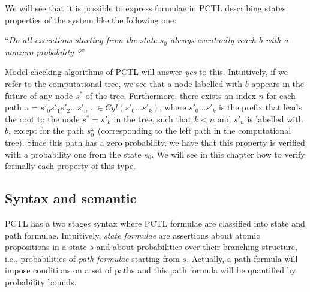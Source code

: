 \begin{example}
\begin{figure}[h]
\begin{minipage}{0.6\linewidth}
    \captionsetup{justification=centering}
    \label{ct2}
  \end{minipage}
\end{figure}
We will see that it is possible to express formulae in PCTL describing states properties of the system like the following one:
\begin{center}
``\textit{Do all executions starting from the state $s_0$ always eventually reach $b$ with a nonzero probability ?}''
\end{center}
Model checking algorithms of PCTL will answer \textit{yes} to this.
Intuitively, if we refer to the computational tree,
we see that a node labelled with $b$ appears in the future of any node $s^*$ of the tree. Furthermore, there exists an index $n$ for each path $\pi = s'_0 s'_1 s'_2 \dots s'_n \dots \in Cyl(s'_0 \dots s'_k)$, where $s'_0 \dots s'_k$ is the prefix that leads the root to the node $s^* = s'_k$ in the tree, such that $k <n$ and $s'_n$ is labelled with $b$, except for the path $s_0^\omega$ (corresponding to the left path in the computational tree).
Since this path has a zero probability, we have that this property is verified with a probability one from the state $s_0$.
We will see in this chapter how to verify formally each property of this type.
\end{example}

\subsection{Syntax and semantic}
PCTL has a two stages syntax where PCTL formulae are classified into state and path formulae. Intuitively, \textit{state formulae} are assertions about atomic propositions in a state $s$ and about probabilities over their branching structure, i.e., probabilities of \textit{path formulae} starting from $s$. Actually, a path formula will impose conditions on a set of paths and this path formula will be quantified
by probability bounds.

